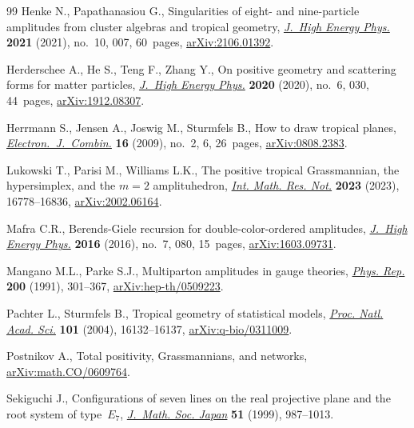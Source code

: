 \documentclass[pdftex]{sigma}
\theoremstyle{definition}
\numberwithin{equation}{section}
\begin{document}
\begin{thebibliography}{99}
Henke N., Papathanasiou G., Singularities of eight- and nine-particle
 amplitudes from cluster algebras and tropical geometry, \href{https://doi.org/10.1007/jhep10(2021)007}{\textit{J.~High
 Energy Phys.}} \textbf{2021} (2021), no.~10, 007, 60~pages,
 \href{https://arxiv.org/abs/2106.01392}{arXiv:2106.01392}.

Herderschee A., He S., Teng F., Zhang Y., On positive geometry and scattering
 forms for matter particles, \href{https://doi.org/10.1007/jhep06(2020)030}{\textit{J.~High Energy Phys.}} \textbf{2020}
 (2020), no.~6, 030, 44~pages, \href{https://arxiv.org/abs/1912.08307}{arXiv:1912.08307}.

Herrmann S., Jensen A., Joswig M., Sturmfels B., How to draw tropical planes,
 \href{https://doi.org/10.37236/72}{\textit{Electron.~J.~Combin.}} \textbf{16} (2009), no.~2, 6, 26~pages,
 \href{https://arxiv.org/abs/0808.2383}{arXiv:0808.2383}.

Lukowski T., Parisi M., Williams L.K., The positive tropical {G}rassmannian,
 the hypersimplex, and the $m=2$ amplituhedron, \href{https://doi.org/10.1093/imrn/rnad010}{\textit{Int. Math. Res. Not.}}
 \textbf{2023} (2023), 16778--16836, \href{https://arxiv.org/abs/2002.06164}{arXiv:2002.06164}.

Mafra C.R., Berends-{G}iele recursion for double-color-ordered amplitudes,
 \href{https://doi.org/10.1007/JHEP07(2016)080}{\textit{J.~High Energy Phys.}} \textbf{2016} (2016), no.~7, 080, 15~pages,
 \href{https://arxiv.org/abs/1603.09731}{arXiv:1603.09731}.

Mangano M.L., Parke S.J., Multiparton amplitudes in gauge theories,
 \href{https://doi.org/10.1016/0370-1573(91)90091-Y}{\textit{Phys. Rep.}} \textbf{200} (1991), 301--367, \href{https://arxiv.org/abs/hep-th/0509223}{arXiv:hep-th/0509223}.

Pachter L., Sturmfels B., Tropical geometry of statistical models,
 \href{https://doi.org/10.1073/pnas.0406010101}{\textit{Proc. Natl. Acad. Sci.}} \textbf{101} (2004), 16132--16137,
 \href{https://arxiv.org/abs/q-bio/0311009}{arXiv:q-bio/0311009}.

Postnikov A., Total positivity, {G}rassmannians, and networks,
 \href{https://arxiv.org/abs/math.CO/0609764}{arXiv:math.CO/0609764}.

Sekiguchi J., Configurations of seven lines on the real projective plane and
 the root system of type~{$E_7$}, \href{https://doi.org/10.2969/jmsj/05140987}{\textit{J.~Math. Soc. Japan}} \textbf{51}
 (1999), 987--1013.


\end{thebibliography}
\end{document}
